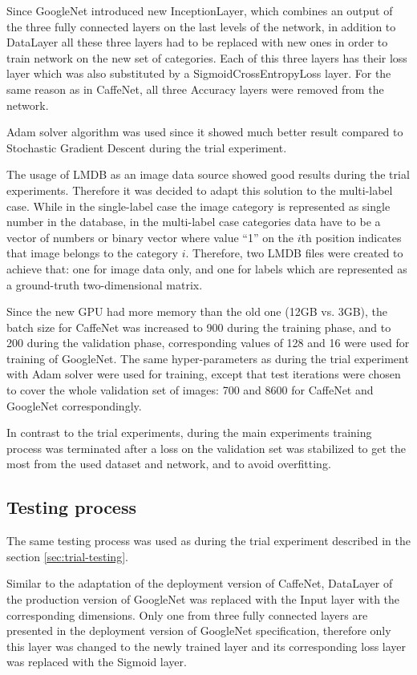     Since GoogleNet introduced new InceptionLayer, which combines an output of the three fully connected layers on the last levels of the network, in addition to DataLayer all these three layers had to be replaced with new ones in order to train network on the new set of categories. Each of this three layers has their loss layer which was also substituted by a SigmoidCrossEntropyLoss layer. For the same reason as in CaffeNet, all three Accuracy layers were removed from the network.
    
    Adam solver algorithm was used since it showed much better result compared to Stochastic Gradient Descent during the trial experiment.

    The usage of LMDB as an image data source showed good results during the trial experiments. Therefore it was decided to adapt this solution to the multi-label case. While in the single-label case the image category is represented as single number in the database, in the multi-label case categories data have to be a vector of numbers or binary vector where value ``1'' on the $i$th position indicates that image belongs to the category $i$. Therefore, two LMDB files were created to achieve that: one for image data only, and one for labels which are represented as a ground-truth two-dimensional matrix.  
    
    Since the new GPU had more memory than the old one (12GB vs. 3GB), the batch size for CaffeNet was increased to 900 during the training phase, and to 200 during the validation phase, corresponding values of 128 and 16 were used for training of GoogleNet. The same hyper-parameters as during the trial experiment with Adam solver were used for training, except that test iterations were chosen to cover the whole validation set of images: 700 and 8600 for CaffeNet and GoogleNet correspondingly.
    
    In contrast to the trial experiments, during the main experiments training process was terminated after a loss on the validation set was stabilized to get the most from the used dataset and network, and to avoid overfitting.

    \subsection{Testing process}
    The same testing process was used as during the trial experiment described in the section \ref{sec:trial-testing}.
    
    Similar to the adaptation of the deployment version of CaffeNet, DataLayer of the production version of GoogleNet was replaced with the Input layer with the corresponding dimensions. Only one from three fully connected layers are presented in the deployment version of GoogleNet specification, therefore only this layer was changed to the newly trained layer and its corresponding loss layer was replaced with the Sigmoid layer.
    
